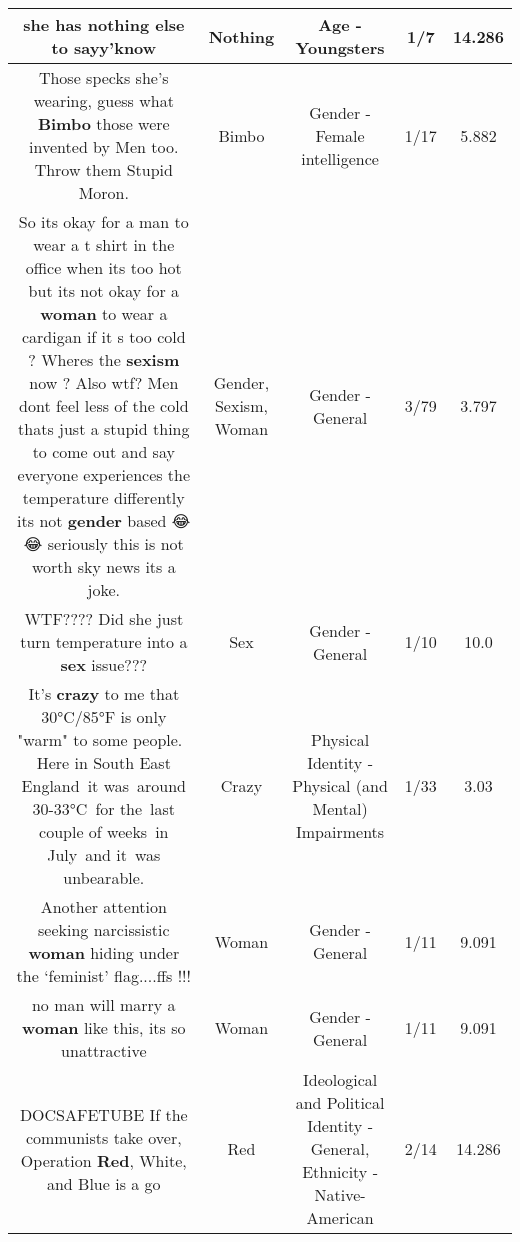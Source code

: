 \documentclass[11pt]{article}
\newlength\mylength
\begin{document}
\begin{center}
\begin{longtable}{|C{.65\mylength}|C{.30\mylength}|C{.12\mylength}|C{.12\mylength}|C{.12\mylength}|}
  \small she has \textbf{nothing} else to sayy'know\normalsize   & Nothing & Age - Youngsters & 1/7 & 14.286 \\  \hline
  \small Those specks she's wearing, guess what \textbf{Bimbo} those were invented by Men too. Throw them Stupid Moron.\normalsize   & Bimbo & Gender - Female intelligence & 1/17 & 5.882 \\  \hline
  \small So its okay for a man to wear a t shirt in the office when its too hot but its not okay for a \textbf{woman} to wear a cardigan if it s too cold ? Wheres the \textbf{sexism} now ? Also wtf? Men dont feel less of the cold thats just a stupid thing to come out and say everyone experiences the temperature differently its not \textbf{gender} based 😂😂 seriously this is not worth sky news its a joke.\normalsize   & Gender, Sexism, Woman & Gender - General & 3/79 & 3.797 \\  \hline
  \small WTF???? Did she just turn temperature into a \textbf{sex} issue???\normalsize   & Sex & Gender - General & 1/10 & 10.0 \\  \hline
  \small It's \textbf{crazy} to me that 30°C/85°F is only "warm" to some people.  Here in South East England it was around 30-33°C for the last couple of weeks in July and it was unbearable.\normalsize   & Crazy & Physical Identity - Physical (and Mental) Impairments & 1/33 & 3.03 \\  \hline
  \small Another attention seeking narcissistic \textbf{woman} hiding under the ‘feminist' flag....ffs !!!\normalsize   & Woman & Gender - General & 1/11 & 9.091 \\  \hline
  \small no man will marry a \textbf{woman} like this, its so unattractive\normalsize   & Woman & Gender - General & 1/11 & 9.091 \\  \hline
  \small DOCSAFETUBE If the communists take over, Operation \textbf{R\textbf{ed}}, White, and Blue is a go\normalsize   & Red &  Ideological and Political Identity - General, Ethnicity - Native-American & 2/14 & 14.286 \\  \hline

\end{longtable}
\end{center}
\end{document}
